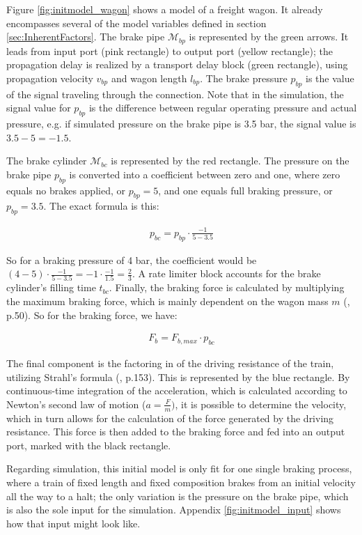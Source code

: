 \par\noindent
Figure \ref{fig:initmodel_wagon} shows a model of a freight wagon. It already encompasses several of the model variables defined in section \ref{sec:InherentFactors}. The brake pipe ${\mathcal{M}}_{bp}$ is represented by the green arrows. It leads from input port (pink rectangle) to output port (yellow rectangle); the propagation delay is realized by a transport delay block (green rectangle), using propagation velocity $v_{bp}$ and wagon length $l_{bp}$. The brake pressure $p_{bp}$ is the value of the signal traveling through the connection. Note that in the simulation, the signal value for $p_{bp}$ is the difference between regular operating pressure and actual pressure, e.g. if simulated pressure on the brake pipe is 3.5 bar, the signal value is $3.5 - 5 = -1.5$.
\par
The brake cylinder ${\mathcal{M}}_{bc}$ is represented by the red rectangle. The pressure on the brake pipe $p_{bp}$ is converted into a coefficient between zero and one, where zero equals no brakes applied, or $p_{bp} = 5$, and one equals full braking pressure, or $p_{bp} = 3.5$. The exact formula is this:

\begin{align*}
p_{bc} = p_{bp} \cdot \frac{-1}{5-3.5}
\end{align*}

\noindent
So for a braking pressure of 4 bar, the coefficient would be $(4 - 5) \cdot \frac{-1}{5-3.5} = -1 \cdot \frac{-1}{1.5} = \frac{2}{3}$. A rate limiter block accounts for the brake cylinder's filling time $t_{bc}$. Finally, the braking force is calculated by multiplying the maximum braking force, which is mainly dependent on the wagon mass $m$ (\cite{Cruceanu2012}, p.50). So for the braking force, we have:

\begin{align*}
F_{b} = F_{b,max} \cdot p_{bc}
\end{align*}

\noindent
The final component is the factoring in of the driving resistance of the train, utilizing Strahl's formula (\cite{Wende2003}, p.153). This is represented by the blue rectangle. By continuous-time integration of the acceleration, which is calculated according to Newton's second law of motion ($a = \frac{F}{m})$, it is possible to determine the velocity, which in turn allows for the calculation of the force generated by the driving resistance. This force is then added to the braking force and fed into an output port, marked with the black rectangle.
\par
Regarding simulation, this initial model is only fit for one single braking process, where a train of fixed length and fixed composition brakes from an initial velocity all the way to a halt; the only variation is the pressure on the brake pipe, which is also the sole input for the simulation. Appendix \ref{fig:initmodel_input} shows how that input might look like.

